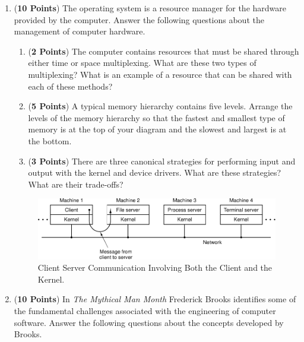 \documentclass[12pt,epsf,psfig,graphics]{article}
\begin{document}
\begin{enumerate}
  
\item ({\bf 10 Points}) The operating system is a resource manager for the hardware provided by the computer.  Answer
  the following questions about the management of computer hardware.

  \begin{enumerate}
          
  \item ({\bf 2 Points}) The computer contains resources that must be shared through either time or space multiplexing.
    What are these two types of multiplexing? What is an example of a resource that can be shared with each of these
    methods?
   
  \item ({\bf 5 Points}) A typical memory hierarchy contains five levels.  Arrange the levels of the memory hierarchy so
    that the fastest and smallest type of memory is at the top of your diagram and the slowest and largest is at the
    bottom.
  
  \item ({\bf 3 Points}) There are three canonical strategies for performing input and output with the
    kernel and device drivers.  What are these strategies? What are their trade-offs?

  \end{enumerate}
        
\newpage

\begin{figure}[t]
\centering
\includegraphics{fig1-27}
\caption{Client Server Communication Involving Both the Client and the Kernel.}
\label{fig:clientserver}
\end{figure}

\item ({\bf 10 Points}) In {\em The Mythical Man Month} Frederick Brooks identifies some of the fundamental challenges
  associated with the engineering of computer software.  Answer the following questions about the concepts developed by
  Brooks.

  \begin{enumerate}
          

\end{enumerate}
\end{enumerate}
\end{document}
